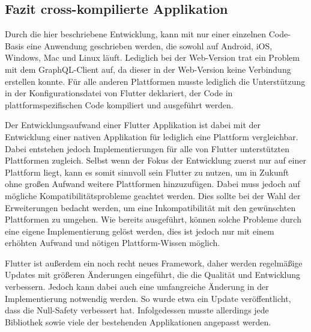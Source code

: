 \subsection{Fazit cross-kompilierte Applikation}
Durch die hier beschriebene Entwicklung, kann mit nur einer einzelnen Code-Basis eine Anwendung geschrieben werden, die sowohl auf Android, iOS, Windows, Mac und Linux läuft. Lediglich bei der Web-Version trat ein Problem mit dem GraphQL-Client auf, da dieser in der Web-Version keine Verbindung erstellen konnte. Für alle anderen Plattformen musste lediglich die Unterstützung in der Konfigurationsdatei von Flutter deklariert, der Code in plattformspezifischen Code kompiliert und ausgeführt werden.

Der Entwicklungsaufwand einer Flutter Applikation ist dabei mit der Entwicklung einer nativen Applikation für lediglich eine Plattform vergleichbar. Dabei entstehen jedoch Implementierungen für alle von Flutter unterstützten Plattformen zugleich. Selbst wenn der Fokus der Entwicklung zuerst nur auf einer Plattform liegt, kann es somit sinnvoll sein Flutter zu nutzen, um in Zukunft ohne großen Aufwand weitere Plattformen hinzuzufügen.
Dabei muss jedoch auf mögliche Kompatibilitätsprobleme geachtet werden.
Dies sollte bei der Wahl der Erweiterungen bedacht werden, um eine Inkompatibilität mit den gewünschten Plattformen zu umgehen. 
Wie bereits ausgeführt, können solche Probleme durch eine eigene Implementierung gelöst werden, dies ist jedoch nur mit einem erhöhten Aufwand und nötigen Plattform-Wissen möglich.

Flutter ist außerdem ein noch recht neues Framework, daher werden regelmäßige Updates mit größeren Änderungen eingeführt, die die Qualität und Entwicklung verbessern. Jedoch kann dabei auch eine umfangreiche Änderung in der Implementierung notwendig werden. So wurde etwa ein Update veröffentlicht, dass die Null-Safety verbessert hat. Infolgedessen musste allerdings jede Bibliothek sowie viele der bestehenden Applikationen angepasst werden.